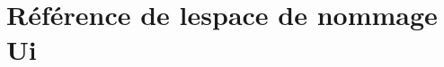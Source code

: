 \hypertarget{namespaceUi}{}\section{Référence de l\textquotesingle{}espace de nommage Ui}
\label{namespaceUi}
